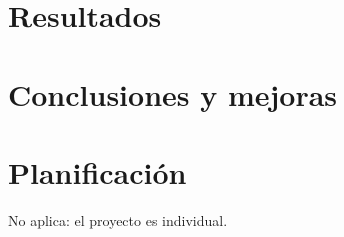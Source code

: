 \documentclass[11pt,a4paper]{article}
\begin{document}


\section{Resultados}



\section{Conclusiones y mejoras}



\section*{Planificación}

No aplica: el proyecto es individual.
\end{document}
